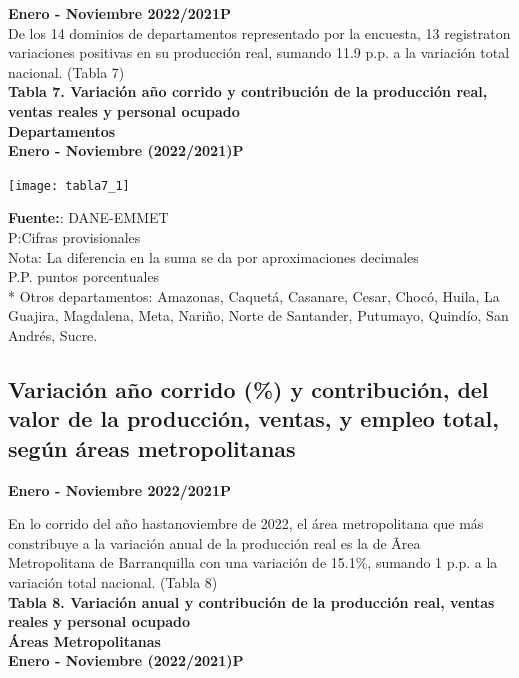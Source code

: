 \documentclass[
]{article}
\begin{document}
\textbf{Enero - Noviembre 2022/2021P}\\

De los 14 dominios de departamentos representado por la encuesta, 13
registraton variaciones positivas en su producción real, sumando 11.9
p.p. a la variación total nacional. (Tabla 7)\\

\textbf{Tabla 7. Variación año corrido y contribución de la producción
real, ventas reales y personal ocupado}\\
\textbf{Departamentos}\\
\textbf{Enero - Noviembre (2022/2021)P}\\

\begin{center}\texttt{[image: tabla7\_1]} \end{center}

\textbf{Fuente:}: DANE-EMMET\\
P:Cifras provisionales\\
Nota: La diferencia en la suma se da por aproximaciones decimales\\
P.P. puntos porcentuales\\
* Otros departamentos: Amazonas, Caquetá, Casanare, Cesar, Chocó, Huila,
La Guajira, Magdalena, Meta, Nariño, Norte de Santander, Putumayo,
Quindío, San Andrés, Sucre.\\

\hypertarget{variaciuxf3n-auxf1o-corrido-y-contribuciuxf3n-del-valor-de-la-producciuxf3n-ventas-y-empleo-total-seguxfan-uxe1reas-metropolitanas}{%
\subsection{Variación año corrido (\%) y contribución, del valor de la
producción, ventas, y empleo total, según áreas
metropolitanas}\label{variaciuxf3n-auxf1o-corrido-y-contribuciuxf3n-del-valor-de-la-producciuxf3n-ventas-y-empleo-total-seguxfan-uxe1reas-metropolitanas}}

\textbf{Enero - Noviembre 2022/2021P}

En lo corrido del año hastanoviembre de 2022, el área metropolitana que
más constribuye a la variación anual de la producción real es la de Ãrea
Metropolitana de Barranquilla con una variación de 15.1\%, sumando 1
p.p. a la variación total nacional. (Tabla 8)\\

\textbf{Tabla 8. Variación anual y contribución de la producción real,
ventas reales y personal ocupado}\\
\textbf{Áreas Metropolitanas}\\
\textbf{Enero - Noviembre (2022/2021)P}
\end{document}
